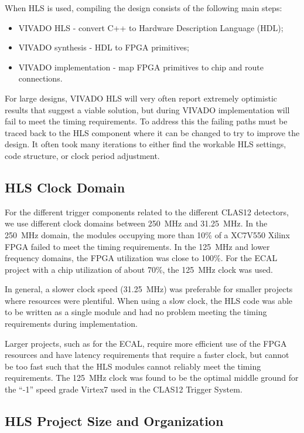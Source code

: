 When HLS is used, compiling the design consists of the following main steps:

\begin{itemize}
	\item VIVADO HLS - convert C++ to Hardware Description Language (HDL);
	\item VIVADO synthesis - HDL to FPGA primitives;
	\item VIVADO implementation - map FPGA primitives to chip and route connections.
\end{itemize}

For large designs, VIVADO HLS will very often report extremely optimistic results that suggest a viable solution, but during VIVADO implementation will fail to meet the timing requirements. To address this the failing paths must be traced back to the HLS component where it can be changed to try to improve the design. It often took many iterations to either find the workable HLS settings, code structure, or clock period adjustment.

\subsection{HLS Clock Domain}

For the different trigger components related to the different CLAS12 detectors, we use different clock domains between 250~MHz and 31.25~MHz. In the 250~MHz domain, the modules occupying more than 10\% of a XC7V550 Xilinx FPGA failed to meet the timing requirements. In the 125~MHz and lower frequency domains, the FPGA utilization was close to 100\%. For the ECAL project with a chip utilization of about 70\%, the 125~MHz clock was used.

In general, a slower clock speed (31.25~MHz) was preferable for smaller projects where resources were plentiful. When using a slow clock, the HLS code was able to be written as a single module and had no problem meeting the timing requirements during implementation.

Larger projects, such as for the ECAL, require more efficient use of the FPGA resources and have latency requirements that require a faster clock, but cannot be too fast such that the HLS modules cannot reliably meet the timing requirements. The 125~MHz clock was found to be the optimal middle ground for the ``-1'' speed grade Virtex7 used in the CLAS12 Trigger System.


\subsection{HLS Project Size and Organization}

